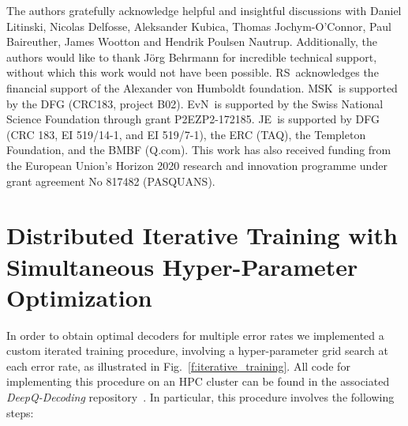 \documentclass[twocolumn,preprintnumbers,amsmath,amssymb,notitlepage,nofootinbib,longbibliography,superscriptaddress,aps,pra,10pt]{revtex4-1}
\begin{document}
	\begin{acknowledgments}
		The authors gratefully acknowledge helpful and insightful discussions with Daniel Litinski, Nicolas Delfosse, Aleksander Kubica, Thomas Jochym-O'Connor, Paul Baireuther, James Wootton and Hendrik Poulsen Nautrup.
		Additionally, the authors would like to thank J\"{o}rg Behrmann for incredible technical support, without which this work would not have been possible.
		RS\ acknowledges the financial support of the Alexander von Humboldt foundation.
		MSK\ is supported by the DFG (CRC183, project B02).
		EvN\ is supported by the Swiss National Science Foundation through grant P2EZP2-172185.
		JE\ is supported by DFG (CRC 183, EI 519/14-1, and EI 519/7-1), the ERC (TAQ), the Templeton Foundation, and the BMBF (Q.com).
		This work has also received funding from the European Union's Horizon 2020 research and innovation programme under grant agreement No 817482 (PASQUANS).
	\end{acknowledgments}

\appendix

\section{Distributed Iterative Training with Simultaneous Hyper-Parameter Optimization}\label{A:training}

	In order to obtain optimal decoders for multiple error rates we implemented a custom iterated training procedure, involving a hyper-parameter grid search at each error rate, as illustrated in Fig.~\ref{f:iterative_training}.
	All code for implementing this procedure on an HPC cluster can be found in the associated \emph{DeepQ-Decoding} repository~\cite{DeepQDecoding}.
	In particular, this procedure involves the following steps:
\end{document}
